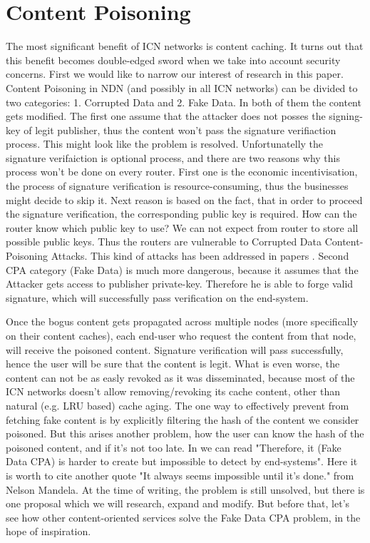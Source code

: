 \documentclass[nostrict]{szablonPG}
\begin{document}
\section{Content Poisoning}
The most significant benefit of ICN networks is content caching. It turns out that this benefit becomes double-edged sword when we take into account security concerns. 
First we would like to narrow our interest of research in this paper. Content Poisoning in NDN (and possibly in all ICN networks) can be divided to two categories: 1. Corrupted Data and 2. Fake Data. In both of them the content gets modified. The first one assume that the attacker does not posses the signing-key of legit publisher, thus the content won't pass the signature verifiaction process. This might look like the problem is resolved. Unfortunatelly the signature verifaiction is optional process, and there are two reasons why this process won't be done on every router. First one is the economic incentivisation, the process of signature verification is resource-consuming, thus the businesses might decide to skip it. Next reason is based on the fact, that in order to proceed the signature verification, the corresponding public key is required. How can the router know which public key to use? We can not expect from router to store all possible public keys. Thus the routers are vulnerable to Corrupted Data Content-Poisoning Attacks. This kind of attacks has been addressed in papers \cite{ghali2014needle} \cite{yu2018content} \cite{nguyen2017content}. Second CPA category (Fake Data) is much more dangerous, because it assumes that the Attacker gets access to publisher private-key. Therefore he is able to forge valid signature, which will successfully pass verification on the end-system. 

Once the bogus content gets propagated across multiple nodes (more specifically on their content caches), each end-user who request the content from that node, will receive the poisoned content. Signature verification will pass successfully, hence the user will be sure that the content is legit. What is even worse, the content can not be as easly revoked as it was disseminated, because most of the ICN networks doesn't allow removing/revoking its cache content, other than natural (e.g. LRU based) cache aging. The one way to effectively prevent from fetching fake content is by explicitly filtering the hash of the content we consider poisoned. But this arises another problem, how the user can know the hash of the poisoned content, and if it's not too late. In \cite{nguyen2017content} we can read "Therefore, it (Fake Data CPA) is harder to create but impossible to detect by end-systems". Here it is worth to cite another quote "It always seems impossible until it's done." from Nelson Mandela. At the time of writing, the problem is still unsolved, but there is one proposal \cite{konorski2019mitigating} which we will research, expand and modify. But before that, let's see how other content-oriented services solve the Fake Data CPA problem, in the hope of inspiration.
\end{document}
